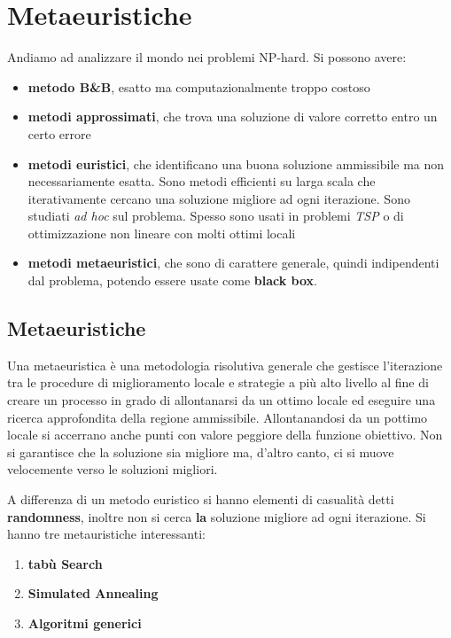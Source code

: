\message{ !name(ro.tex)}\documentclass[a4paper,12pt, oneside]{book}
\begin{document}
\chapter{Metaeuristiche}
Andiamo ad analizzare il mondo nei problemi NP-hard. Si possono avere:
\begin{itemize}
  \item \textbf{metodo B\&B}, esatto ma computazionalmente troppo costoso
  \item \textbf{metodi approssimati}, che trova una soluzione di
  valore corretto entro un certo errore
  \item \textbf{metodi euristici}, che identificano una buona
  soluzione ammissibile ma non necessariamente esatta. Sono metodi
  efficienti su larga scala che iterativamente cercano una soluzione
  migliore ad ogni iterazione. Sono studiati \textit{ad hoc} sul
  problema. Spesso sono usati in problemi \textit{TSP} o di
  ottimizzazione non lineare con molti ottimi locali
  \item \textbf{metodi metaeuristici}, che sono di carattere generale,
  quindi indipendenti dal problema, potendo essere usate come
  \textbf{black box}. 
\end{itemize}
\section{Metaeuristiche}
\begin{definizione}
  Una metaeuristica è una metodologia risolutiva generale che gestisce
  l'iterazione tra le procedure di miglioramento locale e strategie a
  più alto livello al fine di creare un processo in grado di
  allontanarsi da un ottimo locale ed eseguire una ricerca
  approfondita della regione ammissibile. Allontanandosi da un pottimo
  locale si accerrano anche punti con valore peggiore della funzione
  obiettivo. Non si garantisce che la soluzione sia migliore ma,
  d'altro canto, ci si muove velocemente verso le soluzioni migliori. 
\end{definizione}
A differenza di un metodo euristico si hanno elementi di casualità
detti \textbf{randomness}, inoltre non si cerca \textbf{la} soluzione
migliore ad ogni iterazione. Si hanno tre metauristiche interessanti:
\begin{enumerate}
  \item \textbf{tabù Search}
  \item \textbf{Simulated Annealing}
  \item \textbf{Algoritmi generici}
\end{enumerate}
\end{document}
